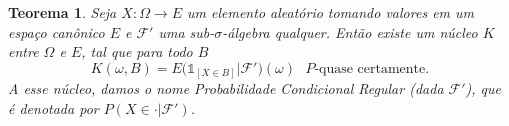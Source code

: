 \documentclass[reqno, final]{book}
\newcommand*\1{\mathds{1}}
\newtheorem{theorem}{Teorema}[section]
\begin{document}

\begin{theorem}
  \label{t:prob_cond_reg_F}
  Seja $X: \Omega \to E$ um elemento aleatório tomando valores em um espaço canônico $E$ e $\mathcal{F}'$ uma sub-$\sigma$-álgebra qualquer.
  Então existe um núcleo $K$ entre $\Omega$ e $E$, tal que para todo $B$
  \begin{equation}
    K(\omega, B) = E\big(\1_{[X \in B]} | \mathcal{F}'\big) (\omega) \text{ $P$-quase certamente.}
  \end{equation}
  A esse núcleo, damos o nome Probabilidade Condicional Regular (dada $\mathcal{F}'$), que é denotada por $P(X \in \cdot|\mathcal{F}')$.
\end{theorem}

\end{document}
